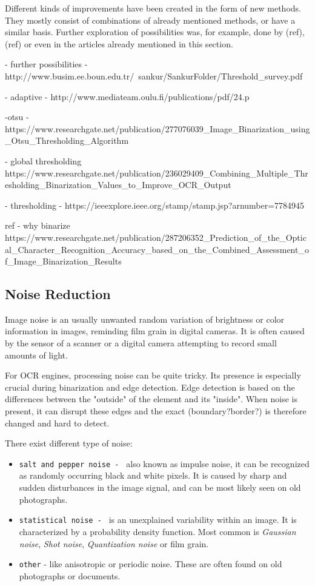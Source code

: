 Different kinds of improvements have been created in the form of new methods. They mostly consist of combinations of already mentioned methods, or have a similar basis. Further exploration of possibilities was, for example, done by (ref), (ref) or even in the articles already mentioned in this section.


- further possibilities - http://www.busim.ee.boun.edu.tr/~sankur/SankurFolder/Threshold_survey.pdf

- adaptive - http://www.mediateam.oulu.fi/publications/pdf/24.p

-otsu - https://www.researchgate.net/publication/277076039_Image_Binarization_using_Otsu_Thresholding_Algorithm

- global thresholding https://www.researchgate.net/publication/236029409_Combining_Multiple_Thresholding_Binarization_Values_to_Improve_OCR_Output

- thresholding - https://ieeexplore.ieee.org/stamp/stamp.jsp?arnumber=7784945

ref - why binarize https://www.researchgate.net/publication/287206352_Prediction_of_the_Optical_Character_Recognition_Accuracy_based_on_the_Combined_Assessment_of_Image_Binarization_Results

\subsection{Noise Reduction}

Image noise is an usually unwanted random variation of brightness or color information in images, reminding film grain in digital cameras. It is often caused by the sensor of a scanner or a digital camera attempting to record small amounts of light. 

For OCR engines, processing noise can be quite tricky. Its presence is especially crucial during binarization and edge detection. Edge detection is based on the differences between the "outside" of the element and its "inside". When noise is present, it can disrupt these edges and the exact (boundary?border?) is therefore changed and hard to detect.

There exist different type of noise:

\begin{itemize}
\item\texttt{salt and pepper noise - } also known as impulse noise, it can be recognized as randomly occurring black and white pixels. It is caused by sharp and sudden disturbances in the image signal, and can be most likely seen on old photographs.

\item\texttt{statistical noise - } is an unexplained variability within an image. It is characterized by a probability density function. Most common is \emph{Gaussian noise}, \emph{Shot noise}, \emph{Quantization noise} or film grain.

\item\texttt{other} - like anisotropic or periodic noise. These are often found on old photographs or documents.

\end{itemize}


